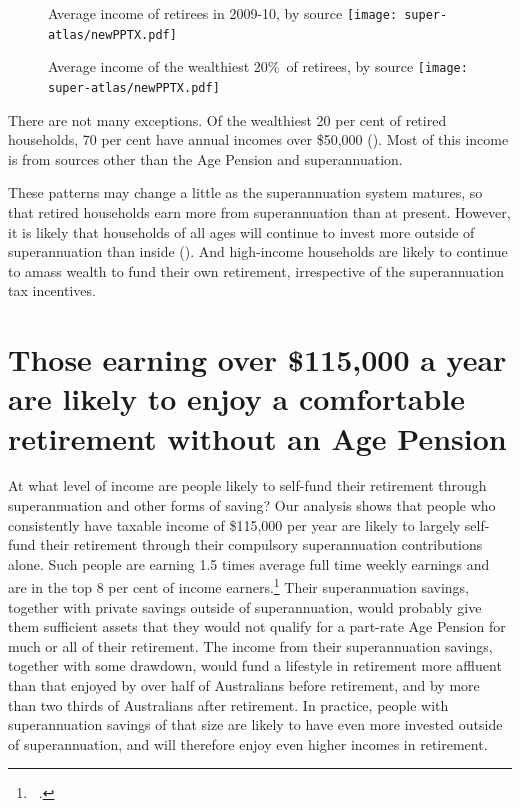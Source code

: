 \documentclass{grattanAlpha}
\begin{document}
\begin{figure}
\begin{minipage}{\columnwidth}
%
{Average income of retirees in 2009-10, by source}\label{fig:SUPER-3-3}
\texttt{[image: super-atlas/newPPTX.pdf]}
\end{minipage}
\begin{minipage}{\columnwidth}
%
{Average income of the wealthiest 20\%\ of retirees, by source}\label{fig:SUPER-3-4}
\texttt{[image: super-atlas/newPPTX.pdf]}
\end{minipage}

\end{figure}

There are not many exceptions. Of the wealthiest 20 per cent of retired households, 70 per cent have annual incomes over \$50,000 (). Most of this income is from sources other than the Age Pension and superannuation. 

These patterns may change a little as the superannuation system matures, so that retired households earn more from superannuation than at present. However, it is likely that households of all ages will continue to invest more outside of superannuation than inside (). And high-income households are likely to continue to amass wealth to fund their own retirement, irrespective of the superannuation tax incentives.

\section{Those earning over \$115,000 a year are likely to enjoy a comfortable retirement without an Age Pension}\label{sec:SUPER-3-3}
At what level of income are people likely to self-fund their retirement through superannuation and other forms of saving? Our analysis shows that people who consistently have taxable income of \$115,000 per year are likely to largely self-fund their retirement through their compulsory superannuation contributions alone. Such people are earning 1.5 times average full time weekly earnings and are in the top 8 per cent of income earners.\footnote{\gao\ \textcites{ATO2015SampleFile1213}{ABS2013AWE}.} Their superannuation savings, together with private savings outside of superannuation, would probably give them sufficient assets that they would not qualify for a part-rate Age Pension for much or all of their retirement. The income from their superannuation savings, together with some drawdown, would fund a lifestyle in retirement more affluent than that enjoyed by over half of Australians before retirement, and by more than two thirds of Australians after retirement. In practice, people with superannuation savings of that size are likely to have even more invested outside of superannuation, and will therefore enjoy even higher incomes in retirement.
\end{document}
